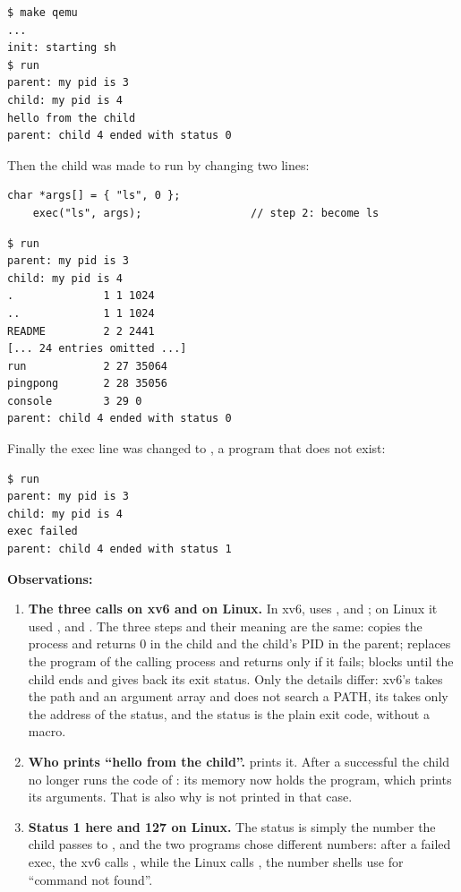 \documentclass[11pt,a4paper]{article}
\begin{document}
\begin{lstlisting}[caption={run in xv6: the child becomes echo}]
$ make qemu
...
init: starting sh
$ run
parent: my pid is 3
child: my pid is 4
hello from the child
parent: child 4 ended with status 0
\end{lstlisting}

Then the child was made to run  by changing two lines:

\begin{lstlisting}[style=ccode,firstnumber=18,caption={The change that makes the child run ls}]
    char *args[] = { "ls", 0 };
    exec("ls", args);                 // step 2: become ls
\end{lstlisting}

\begin{lstlisting}[caption={run in xv6: the child becomes ls}]
$ run
parent: my pid is 3
child: my pid is 4
.              1 1 1024
..             1 1 1024
README         2 2 2441
[... 24 entries omitted ...]
run            2 27 35064
pingpong       2 28 35056
console        3 29 0
parent: child 4 ended with status 0
\end{lstlisting}

Finally the exec line was changed to , a program that does not
exist:

\begin{lstlisting}[caption={run in xv6: exec of a missing program}]
$ run
parent: my pid is 3
child: my pid is 4
exec failed
parent: child 4 ended with status 1
\end{lstlisting}

\textbf{Observations:}
\begin{enumerate}
  \item \textbf{The three calls on xv6 and on Linux.} In xv6,  uses ,
   and ; on Linux it used ,  and
  . The three steps and their meaning are the same:  copies the
  process and returns 0 in the child and the child's PID in the parent;  replaces the
  program of the calling process and returns only if it fails;  blocks until the child
  ends and gives back its exit status. Only the details differ: xv6's  takes the path
  and an argument array and does not search a PATH, its  takes only the address of the
  status, and the status is the plain exit code, without a  macro.
  \item \textbf{Who prints ``hello from the child''.}  prints it. After a successful
   the child no longer runs the code of : its memory now holds the
   program, which prints its arguments. That is also why  is not
  printed in that case.
  \item \textbf{Status 1 here and 127 on Linux.} The status is simply the number the child passes
  to , and the two programs chose different numbers: after a failed exec, the xv6
   calls , while the Linux  calls , the
  number shells use for ``command not found''.
\end{enumerate}
\end{document}
